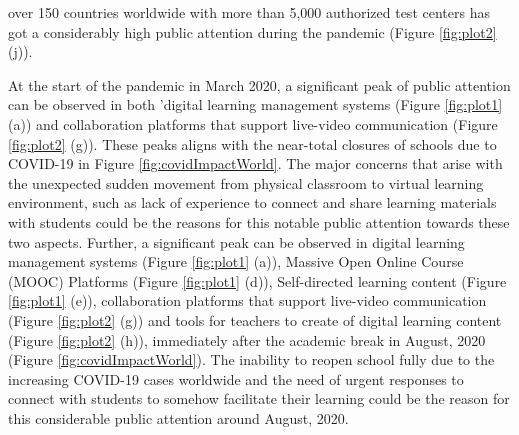 \documentclass[11pt,a4paper,]{article}
\begin{document}
over 150 countries worldwide with more than 5,000 authorized test centers has got a considerably high public attention during the pandemic (Figure \ref{fig:plot2} (j)).

At the start of the pandemic in March 2020, a significant peak of public attention can be observed in both 'digital learning management systems (Figure \ref{fig:plot1} (a)) and collaboration platforms that support live-video communication (Figure \ref{fig:plot2} (g)). These peaks aligns with the near-total closures of schools due to COVID-19 in Figure \ref{fig:covidImpactWorld}. The major concerns that arise with the unexpected sudden movement from physical classroom to virtual learning environment, such as lack of experience to connect and share learning materials with students could be the reasons for this notable public attention towards these two aspects. Further, a significant peak can be observed in digital learning management systems (Figure \ref{fig:plot1} (a)), Massive Open Online Course (MOOC) Platforms (Figure \ref{fig:plot1} (d)), Self-directed learning content (Figure \ref{fig:plot1} (e)), collaboration platforms that support live-video communication (Figure \ref{fig:plot2} (g)) and tools for teachers to create of digital learning content (Figure \ref{fig:plot2} (h)), immediately after the academic break in August, 2020 (Figure \ref{fig:covidImpactWorld}). The inability to reopen school fully due to the increasing COVID-19 cases worldwide and the need of urgent responses to connect with students to somehow facilitate their learning could be the reason for this considerable public attention around August, 2020.
\end{document}
